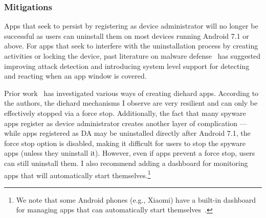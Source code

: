 


\subsubsection{Mitigations}
Apps that seek to persist by registering as device administrator will
no longer be successful as users can uninstall them on most devices
running Android 7.1 or above. For apps that seek to interfere with the
uninstallation process by creating activities or locking the device,
past literature on malware defense~\cite{fernandes2016android,
  aljarrah2016maintaining} has suggested improving attack detection
and introducing system level support for detecting and reacting when
an app window is covered.


Prior work~\cite{zhou2020demystifying} has investigated various ways
of creating diehard apps. According to the authors, the diehard
mechanisms I observe are very resilient and can only be effectively
stopped via a force stop.
Additionally, the fact that many spyware apps register as device administrator
creates another layer of complication --- while apps registered as DA may be
uninstalled directly after Android 7.1, the force stop option is disabled,
making it difficult for users to stop the spyware apps (unless they uninstall
it).
However, even if apps prevent a force stop, users can still uninstall
them.
I also recommend adding a dashboard for monitoring apps that will automatically
start themselves.\footnote{We note that some Android phones (e.g., Xiaomi) have a
built-in dashboard for managing apps that can automatically start
themselves~\cite{HowtoDis42:online}.}

